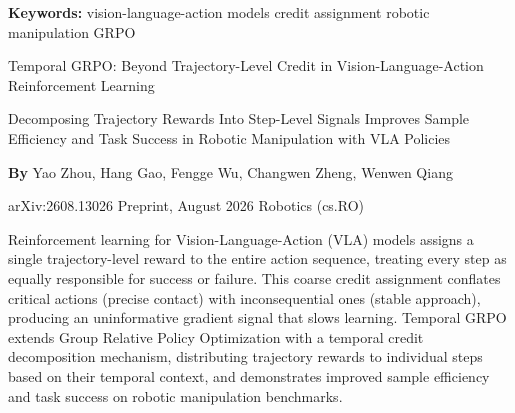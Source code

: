 \documentclass[10pt,twocolumn]{article}
\begin{document}
\setlength{\parindent}{0pt}
\setlength{\parskip}{4pt}

{\small\color{keywordgray}\textbf{Keywords:}
  vision-language-action models \textbullet{}
  credit assignment \textbullet{}
  robotic manipulation \textbullet{}
  GRPO}\par\vspace{4pt}

{\LARGE\bfseries\raggedright
  Temporal GRPO: Beyond Trajectory-Level Credit
  in Vision-Language-Action Reinforcement Learning}\par\vspace{4pt}

{\large\itshape\raggedright
  Decomposing Trajectory Rewards Into Step-Level Signals Improves
  Sample Efficiency and Task Success in Robotic Manipulation
  with VLA Policies}\par\vspace{6pt}

{\small\textbf{By} Yao Zhou, Hang Gao, Fengge Wu,
  Changwen Zheng, Wenwen Qiang}\par\vspace{2pt}

{\small\color{keywordgray}arXiv:2608.13026 \textbullet{} Preprint, August 2026 \textbullet{}
  Robotics (cs.RO)}
\par\vspace{2pt}\noindent{\color{rulered}\rule{\columnwidth}{0.6pt}}\vspace{6pt}

Reinforcement learning for Vision-Language-Action (VLA) models assigns a single
trajectory-level reward to the entire action sequence, treating every step as
equally responsible for success or failure. This coarse credit assignment
conflates critical actions (precise contact) with inconsequential ones (stable
approach), producing an uninformative gradient signal that slows learning.
Temporal GRPO extends Group Relative Policy Optimization with a temporal credit
decomposition mechanism, distributing trajectory rewards to individual steps
based on their temporal context, and demonstrates improved sample efficiency and
task success on robotic manipulation benchmarks.
\end{document}
